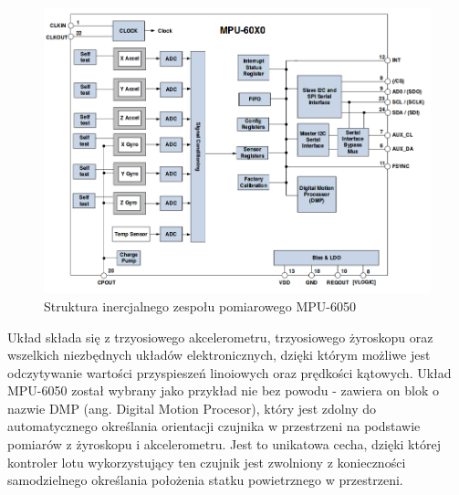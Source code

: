 \begin{figure}[H]
	\centering
	\includegraphics[scale=0.5]{Pictures/IMU.png}
        \caption[Struktura inercjalnego zespołu pomiarowego]{Struktura inercjalnego zespołu pomiarowego MPU-6050~\cite{ds_mpu6050}}
        \label{fig:IMU}
\end{figure}

Układ składa się z trzyosiowego akcelerometru, trzyosiowego żyroskopu oraz wszelkich niezbędnych układów elektronicznych, dzięki którym możliwe jest odczytywanie wartości przyspieszeń linoiowych oraz prędkości kątowych. Układ MPU-6050 został wybrany jako przykład nie bez powodu - zawiera on blok o nazwie DMP (ang. Digital Motion Procesor), który jest zdolny do automatycznego określania orientacji czujnika w przestrzeni na podstawie pomiarów z żyroskopu i akcelerometru. Jest to unikatowa cecha, dzięki której kontroler lotu wykorzystujący ten czujnik jest zwolniony z konieczności samodzielnego określania  położenia statku powietrznego w przestrzeni. 
